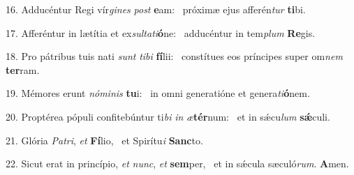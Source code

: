 16. Adducéntur Regi vír\textit{gi}\textit{nes} \textit{post} \textbf{e}am: \ast\  próximæ ejus afferén\textit{tur} \textbf{ti}bi.\

17. Afferéntur in lætítia et ex\textit{sul}\textit{ta}\textit{ti}\textbf{ó}ne: \ast\  adducéntur in tem\textit{plum} \textbf{Re}gis.\

18. Pro pátribus tuis nati \textit{sunt} \textit{ti}\textit{bi} \textbf{fí}lii: \ast\  constítues eos príncipes super om\textit{nem} \textbf{ter}ram.\

19. Mémores erunt \textit{nó}\textit{mi}\textit{nis} \textbf{tu}i: \ast\  in omni generatióne et genera\textit{ti}\textbf{ó}nem.\

20. Proptérea pópuli confitebúntur ti\textit{bi} \textit{in} \textit{æ}\textbf{tér}num: \ast\  et in sǽcu\textit{lum} \textbf{sǽ}culi.\

21. Glória \textit{Pa}\textit{tri}, \textit{et} \textbf{Fí}lio, \ast\  et Spirítu\textit{i} \textbf{Sanc}to.\

22. Sicut erat in princípio, \textit{et} \textit{nunc}, \textit{et} \textbf{sem}per, \ast\  et in sǽcula sæculó\textit{rum}. \textbf{A}men.\

